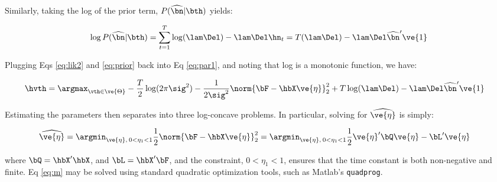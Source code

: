\noindent Similarly, taking the log of the prior term, $P(\hnm | \bth )$ yields:

\begin{align} \label{eq:prior}
\log P(\hnm | \bth) =  \sum _{t=1}^T \log(\lam \Del)  -\lam \Del \hn_t =T (\lam \Del) - \lam \Del \hnm' \ve{1} 
\end{align}

\noindent Plugging Eqs \eqref{eq:lik2} and \eqref{eq:prior} back into Eq \eqref{eq:par1}, and noting that log is a monotonic function, we have:



\begin{align} 
\hvth &=\argmax_{\vth \in \ve{\Theta}} - \frac{T}{2} \log (2\pi\sig^2) - \frac{1}{2\sig^2} \norm{\bF - \hbX \ve{\eta}}_2^2 + T \log (\lam \Del) - \lam \Del \hnm' \ve{1} \label{eq:par} 
\end{align}

\noindent %
Estimating the parameters then separates into three log-concave problems.  In particular, solving for $\widehat{\ve{\eta}}$ is simply:

\begin{align} 
\widehat{\ve{\eta}} &= \argmin_{\ve{\eta},\: 0< \eta_1<1} \frac{1}{2} \norm{\bF - \hbX \ve{\eta}}_2^2 
=  \argmin_{\ve{\eta},\: 0< \eta_1<1} \frac{1}{2} \ve{\eta}' \bQ  \ve{\eta} - \bL'  \ve{\eta} \label{eq:m} 
\end{align}

\noindent where $\bQ=\hbX' \hbX$, and $\bL=\hbX' \bF$, and the constraint, $0<\eta_1<1$, ensures that the time constant is both non-negative and finite.  Eq \eqref{eq:m} may be solved using standard quadratic optimization tools, such as Matlab's \texttt{quadprog}.  

